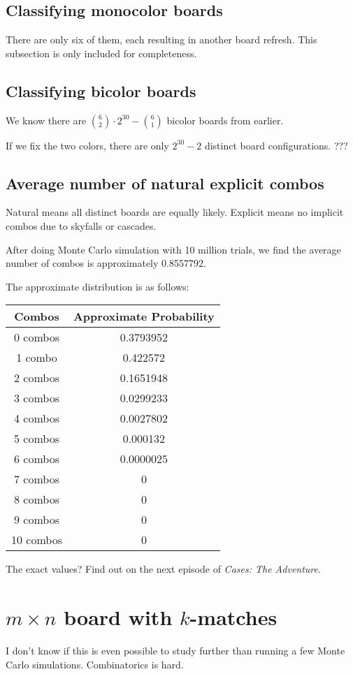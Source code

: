 \documentclass[12pt]{article}
\theoremstyle{definition}
\begin{document}
\subsection{Classifying monocolor boards}
There are only six of them, each resulting in another board refresh. This subsection is only included for completeness.
\subsection{Classifying bicolor boards}
We know there are $\binom{6}{2}\cdot 2^{30}-\binom{6}{1}$ bicolor boards from earlier.

If we fix the two colors, there are only $2^{30}-2$ distinct board configurations. ???
\subsection{Average number of natural explicit combos}
Natural means all distinct boards are equally likely. Explicit means no implicit combos due to skyfalls or cascades.

After doing Monte Carlo simulation with 10 million trials, we find the average number of combos is approximately 0.8557792.

The approximate distribution is as follows:
\begin{center}
\begin{tabular}{|c|c|}
    \hline
    Combos & Approximate Probability \\
    \hline\hline
    0 combos & 0.3793952 \\
    \hline
    1 combo & 0.422572 \\
    \hline
    2 combos & 0.1651948 \\
    \hline
    3 combos & 0.0299233 \\
    \hline
    4 combos & 0.0027802 \\
    \hline
    5 combos & 0.000132 \\
    \hline
    6 combos & 0.0000025 \\
    \hline
    7 combos & 0 \\
    \hline
    8 combos & 0 \\
    \hline
    9 combos & 0 \\
    \hline
    10 combos & 0 \\
    \hline
\end{tabular}
\end{center}
\begin{center}
\end{center}
The exact values? Find out on the next episode of \textit{Cases: The Adventure}.
\section{$m\times n$ board with $k$-matches}
I don't know if this is even possible to study further than running a few Monte Carlo simulations. Combinatorics is hard.
\end{document}
